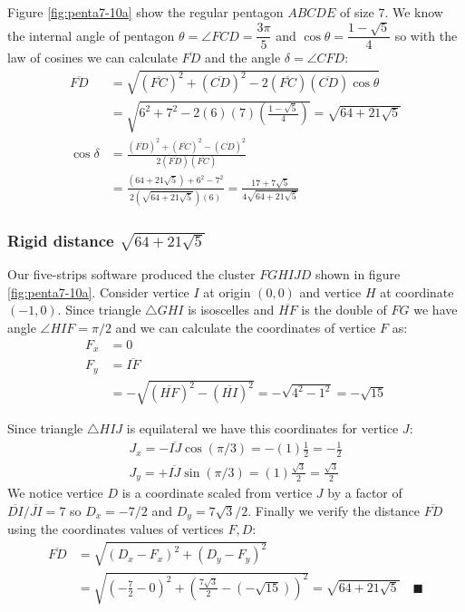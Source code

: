 \documentclass[11pt]{article}
\begin{document}
Figure \ref{fig:penta7-10a} show the regular pentagon $ABCDE$ of size $7$. We know the internal angle of pentagon $\theta=\angle{FCD} =\dfrac{3\pi}5$ and $\cos\theta=\dfrac{1-\sqrt5}4$ so with the law of cosines we can calculate $\overline{FD}$ and the angle $\delta = \angle{CFD}$:
\begin{align}
\overline{FD} &= \sqrt{(\overline{FC})^2 + (\overline{CD})^2
 - 2(\overline{FC})(\overline{CD})\cos\theta} \nonumber\\
 &= \sqrt{6^2 + 7^2 - 2(6)(7)\left(\frac{1-\sqrt5}4\right)} = \sqrt{64 + 21\sqrt5}\\
%
\cos\delta &= \frac{(\overline{FD})^2 + (\overline{FC})^2 - (\overline{CD})^2}
 {2(\overline{FD})(\overline{FC})} \nonumber\\
 &= \frac{\left(64 + 21\sqrt5\right) + 6^2 - 7^2}
  {2\left(\sqrt{64 + 21\sqrt5}\right)(6)}
  = \frac{17 + 7\sqrt5}{4\sqrt{64 + 21\sqrt5}}
\end{align}

\subsubsection{Rigid distance $\sqrt{64 + 21\sqrt5}$}

Our five-strips software produced the cluster $FGHIJD$ shown in figure \ref{fig:penta7-10a}. Consider vertice $I$ at origin $(0,0)$ and vertice $H$ at coordinate $(-1,0)$. Since triangle $\triangle{GHI}$ is isoscelles and $\overline{HF}$ is the double of ${FG}$ we have angle $\angle{HIF} = \pi/2$ and we can calculate the coordinates of vertice $F$ as:
\begin{align}
F_x &= 0 \\
F_y &= \overline{IF} \nonumber\\
 &= -\sqrt{(\overline{HF})^2 - (\overline{HI})^2} = -\sqrt{4^2 - 1^2} = -\sqrt{15}
\end{align}

Since triangle $\triangle{HIJ}$ is equilateral we have this coordinates for vertice $J$:
\begin{align}
J_x = -\overline{IJ}\cos(\pi/3) = -(1)\frac{1}2 = -\frac{1}2 \\
J_y = +\overline{IJ}\sin(\pi/3) = (1)\frac{\sqrt3}2 = \frac{\sqrt3}2
\end{align}
We notice vertice $D$ is a coordinate scaled from vertice $J$ by a factor of $\overline{DI} / \overline{JI} = 7$ so $D_x = -7/2$ and $D_y = 7\sqrt3 / 2$. Finally we verify the distance $\overline{FD}$ using the coordinates values of vertices $F,D$:
\begin{align}
\overline{FD} &= \sqrt{(D_x - F_x)^2 + (D_y - F_y)^2} \nonumber\\
 &= \sqrt{\left(-\frac{7}2 - 0\right)^2 + \left( \frac{7\sqrt3}2 - (-\sqrt{15})\right)^2}
 = \sqrt{64 + 21\sqrt5} \quad \blacksquare
\end{align}
\end{document}
